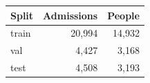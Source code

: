 \begin{tabular}{lrr}
\toprule
Split & Admissions & People \\
\midrule
train & 20,994 & 14,932 \\
val & 4,427 & 3,168 \\
test & 4,508 & 3,193 \\
\bottomrule
\end{tabular}
